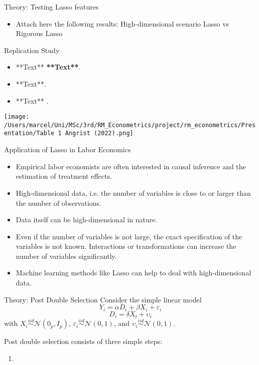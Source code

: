 \documentclass{beamer}
\begin{document}
\begin{frame}{Theory: Testing Lasso features}
	\begin{itemize}
		\item Attach here the following results: High-dimensional scenario Lasso vs Rigorous Lasso
	\end{itemize}
\end{frame}


\begin{frame}{Replication Study}
\begin{itemize}
  
\item **Text** \textbf{**Text**}.
\item **Text**. 
\item **Text** .
\end{itemize}

\texttt{[image: /Users/marcel/Uni/MSc/3rd/RM\_Econometrics/project/rm\_econometrics/Presentation/Table 1 Angrist (2022).png]}
\end{frame}

\begin{frame}{Application of Lasso in Labor Economics}
\begin{itemize}
	\item Empirical labor economists are often interested in causal inference and the estimation of treatment effects.
	\item High-dimensional data, i.e. the number of variables is close to or larger than the number of observations.
	\item Data itself can be high-dimensional in nature.
	\item Even if the number of variables is not large, the exact specification of the variables is not known. Interactions or transformations can increase the number of variables significantly.
	\item Machine learning methods like Lasso can help to deal with high-dimensional data.
\end{itemize}	
\end{frame}

\begin{frame}{Theory: Post Double Selection}
Consider the simple linear model
\begin{equation}
	Y_i = \alpha D_i + \beta X_i + \varepsilon_i
\end{equation}
\begin{equation}
	D_i = \delta X_i + \upsilon_i
\end{equation}
with \(X_i \stackrel{iid}{\sim} \mathcal{N}(0_p,I_p)\), \(\varepsilon_i \stackrel{iid}{\sim} \mathcal{N}(0,1)\), and \(\upsilon_i \stackrel{iid}{\sim} \mathcal{N}(0,1)\).

Post double selection consists of three simple steps:
\begin{enumerate}
	\item 
\end{enumerate}
\end{frame}
\end{document}
